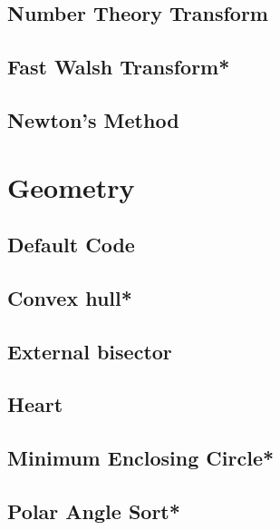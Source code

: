 \subsection{Number Theory Transform}

\subsection{Fast Walsh Transform*} %

%
\subsection{Newton's Method}


\section{Geometry}
\subsection{Default Code}

\subsection{Convex hull*} %

\subsection{External bisector}

\subsection{Heart}

\subsection{Minimum Enclosing Circle*} %

\subsection{Polar Angle Sort*} %

